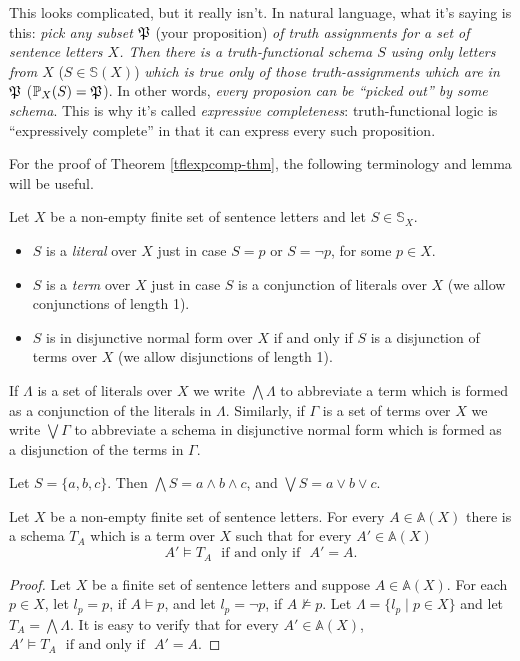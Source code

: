 \begin{aside}
    This looks complicated, but it really isn't. In natural language, what it's saying is this: \emph{pick any subset $\mfp$} (your proposition) \emph{of truth assignments for a set of sentence letters $X$. Then there is a truth-functional schema $S$ using only letters from $X$} ($S\in\mathbb{S}(X)$) \emph{which is true only of those truth-assignments which are in $\mfp$} ($\prop{S}{X}=\mfp$). In other words, \emph{every proposion can be ``picked out'' by some schema}. This is why it's called \emph{expressive completeness}: truth-functional logic is ``expressively complete'' in that it can express every such proposition. 
\end{aside}

For the proof of Theorem \ref{tflexpcomp-thm}, the following terminology and lemma will be useful. 
\begin{definition}
Let $X$ be a non-empty finite set of sentence letters and let $S\in\mathbb{S}_X$.
\begin{itemize}
\item $S$ is a \emph{literal} over $X$ just in case $S = p$ or $S = \neg p$, for some $p\in X$.
\item $S$ is a \emph{term} over $X$ just in case $S$ is a conjunction of literals over $X$ (we allow conjunctions of length 1).
\item $S$ is in disjunctive normal form over $X$ if and only if $S$ is a disjunction of terms over $X$ (we allow disjunctions of length 1). 
\end{itemize}
\end{definition}
If $\Lambda$ is a set of literals over $X$ we write $\bigwedge \Lambda$ to abbreviate a term which is formed as a conjunction of the literals in $\Lambda$. Similarly, if $\Gamma$ is a set of terms over $X$ we write $\bigvee\Gamma$ to abbreviate a schema in disjunctive normal form which is formed as a disjunction of the terms in $\Gamma$.

\begin{example}
    Let $S = \{a, b, c\}$. Then $\bigwedge S = a \land b \land c$, and $\bigvee S = a \vee b \vee c$.
\end{example}

\begin{lemma}\label{tflexpcomp-lem}
Let $X$ be a non-empty finite set of sentence letters. For every $A\in\mathbb{A}(X)$ there is a schema $T_A$ which is a term over $X$ such that for every $A'\in\mathbb{A}(X)$
\[A'\models T_A\ \ \ \mbox{if and only if}\ \ \ A'=A.\]
\end{lemma}
\begin{proof}
Let $X$ be a finite set of sentence letters and suppose $A\in\mathbb{A}(X)$. For each $p\in X$, let $l_p = p$, if $A\models p$, and let $l_p = \neg p$, if $A\not\models p$. Let $\Lambda=\{l_p\mid p\in X\}$ and let $T_A = \bigwedge\Lambda$. It is easy to verify that
for every $A'\in\mathbb{A}(X)$, 
$A'\models T_A\ \ \ \mbox{if and only if}\ \ \ A'=A$. 
\end{proof}    

